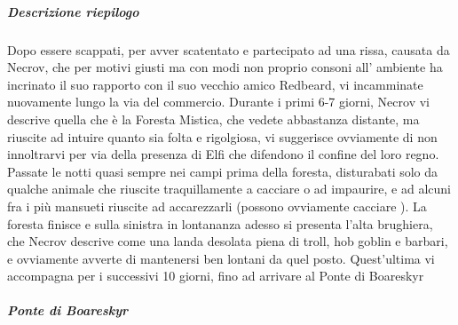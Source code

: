 \documentclass{article}
\begin{document}
                \subparagraph{Descrizione riepilogo}
                Dopo essere scappati, per avver scatentato e partecipato ad una rissa, causata da Necrov, che per motivi giusti ma con modi non proprio consoni all' ambiente ha incrinato  il suo rapporto con il suo vecchio amico Redbeard, vi incamminate nuovamente lungo la via del commercio. Durante i primi 6-7 giorni, Necrov vi descrive quella che è la Foresta Mistica, che vedete abbastanza distante, ma riuscite ad intuire quanto sia folta e rigolgiosa, vi suggerisce ovviamente di non innoltrarvi per via della presenza di Elfi che difendono il confine del loro regno. Passate le notti quasi sempre nei campi prima della foresta, disturabati solo da qualche animale che riuscite traquillamente a cacciare o ad impaurire, e ad alcuni fra i più mansueti riuscite ad accarezzarli (possono ovviamente cacciare ). La foresta finisce e sulla sinistra in lontananza adesso si presenta l'alta brughiera, che Necrov descrive come una landa desolata piena di troll, hob goblin e barbari, e ovviamente avverte di mantenersi ben lontani da quel posto. Quest'ultima vi accompagna per i successivi 10 giorni, fino ad arrivare al Ponte di Boareskyr


                \subparagraph{Ponte di Boareskyr}
\end{document}
